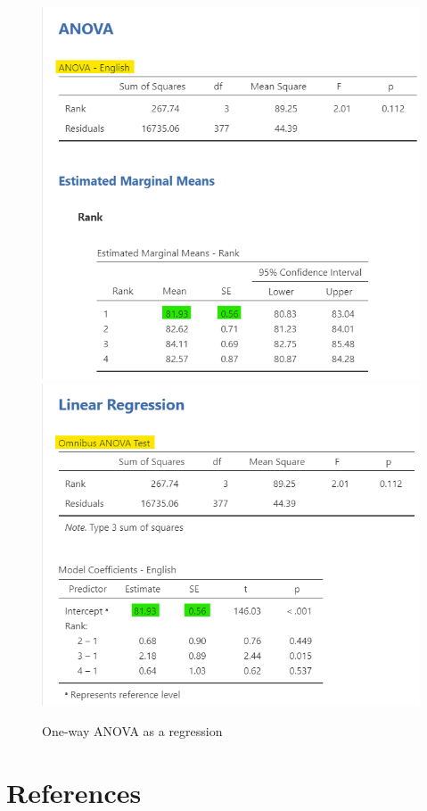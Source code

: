 \documentclass[
]{book}
\begin{document}
\begin{figure}

{\centering \includegraphics[width=0.49\linewidth]{images/14-regression-wrap-up/anova1} \includegraphics[width=0.49\linewidth]{images/14-regression-wrap-up/anova2} 

}

\caption{One-way ANOVA as a regression}\label{fig:unnamed-chunk-4}
\end{figure}

\hypertarget{appendix-appendices}{%
\appendix}


\hypertarget{references}{%
\chapter{References}\label{references}}

  
\end{document}
